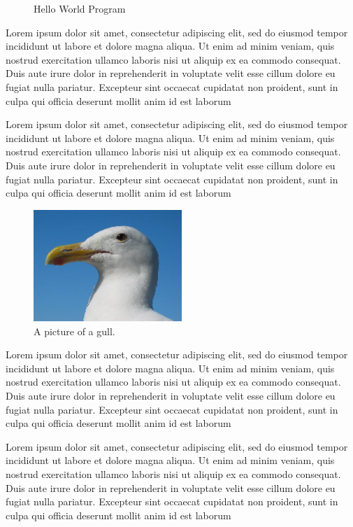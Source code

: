 \begin{figure}[!ht]
\centering
{}
\caption{Hello World Program}\label{figure:helloworld}
\end{figure}
Lorem ipsum dolor sit amet, consectetur adipiscing elit, sed do eiusmod tempor incididunt ut labore et dolore magna aliqua. Ut enim ad minim veniam, quis nostrud exercitation ullamco laboris nisi ut aliquip ex ea commodo consequat. Duis aute irure dolor in reprehenderit in voluptate velit esse cillum dolore eu fugiat nulla pariatur. Excepteur sint occaecat cupidatat non proident, sunt in culpa qui officia deserunt mollit anim id est laborum

Lorem ipsum dolor sit amet, consectetur adipiscing elit, sed do eiusmod tempor incididunt ut labore et dolore magna aliqua. Ut enim ad minim veniam, quis nostrud exercitation ullamco laboris nisi ut aliquip ex ea commodo consequat. Duis aute irure dolor in reprehenderit in voluptate velit esse cillum dolore eu fugiat nulla pariatur. Excepteur sint occaecat cupidatat non proident, sunt in culpa qui officia deserunt mollit anim id est laborum

\begin{figure}[!ht] %
  \centering
  \includegraphics[width=0.5\textwidth]{images/gull.png}
  \caption{A picture of a gull.}
\end{figure}

Lorem ipsum dolor sit amet, consectetur adipiscing elit, sed do eiusmod tempor incididunt ut labore et dolore magna aliqua. Ut enim ad minim veniam, quis nostrud exercitation ullamco laboris nisi ut aliquip ex ea commodo consequat. Duis aute irure dolor in reprehenderit in voluptate velit esse cillum dolore eu fugiat nulla pariatur. Excepteur sint occaecat cupidatat non proident, sunt in culpa qui officia deserunt mollit anim id est laborum

Lorem ipsum dolor sit amet, consectetur adipiscing elit, sed do eiusmod tempor incididunt ut labore et dolore magna aliqua. Ut enim ad minim veniam, quis nostrud exercitation ullamco laboris nisi ut aliquip ex ea commodo consequat. Duis aute irure dolor in reprehenderit in voluptate velit esse cillum dolore eu fugiat nulla pariatur. Excepteur sint occaecat cupidatat non proident, sunt in culpa qui officia deserunt mollit anim id est laborum

